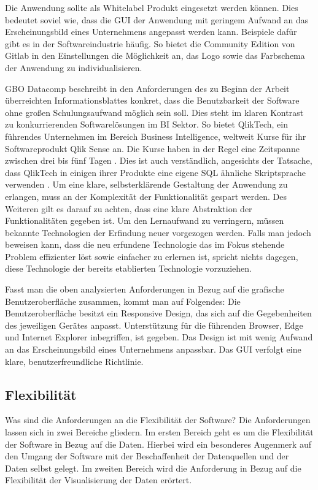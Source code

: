 Die Anwendung sollte als Whitelabel Produkt eingesetzt werden können. Dies bedeutet soviel wie,
dass die GUI der Anwendung mit geringem Aufwand an das Erscheinungsbild eines Unternehmens angepasst
werden kann. Beispiele dafür gibt es in der Softwareindustrie häufig. So bietet die Community
Edition von Gitlab in den Einstellungen die Möglichkeit an, das Logo sowie das Farbschema der Anwendung
zu individualisieren.\cite{GitlabDocs}

GBO Datacomp beschreibt in den Anforderungen des zu Beginn der Arbeit überreichten
Informationsblattes konkret, dass die Benutzbarkeit der Software ohne großen Schulungsaufwand möglich sein soll.
Dies steht im klaren Kontrast zu konkurrierenden Softwarelösungen im BI Sektor.
So bietet QlikTech, ein führendes Unternehmen im Bereich Business Intelligence,
weltweit Kurse für ihr Softwareprodukt Qlik Sense an. Die Kurse haben in der
Regel eine Zeitspanne zwischen drei bis fünf Tagen \cite{QlikSenseTraining}.
Dies ist auch verständlich, angesichts der Tatsache, dass QlikTech in einigen
ihrer Produkte eine eigene SQL ähnliche Skriptsprache verwenden \cite{QlikSenseScriptLanguage}.
Um eine klare, selbsterklärende Gestaltung der Anwendung zu erlangen,
muss an der Komplexität der Funktionalität gespart werden. Des Weiteren
gilt es darauf zu achten, dass eine klare Abstraktion der Funktionalitäten
gegeben ist. Um den Lernaufwand zu verringern, müssen bekannte Technologien
der Erfindung neuer vorgezogen werden. Falls man jedoch beweisen kann,
dass die neu erfundene Technologie das im Fokus stehende Problem effizienter löst
sowie einfacher zu erlernen ist, spricht nichts dagegen, diese Technologie der bereits
etablierten Technologie vorzuziehen.

Fasst man die oben analysierten Anforderungen in Bezug auf die grafische Benutzeroberfläche
zusammen, kommt man auf Folgendes: Die Benutzeroberfläche besitzt ein Responsive Design,
das sich auf die Gegebenheiten des jeweiligen Gerätes anpasst. Unterstützung
für die führenden Browser, Edge und Internet Explorer inbegriffen, ist gegeben.
Das Design ist mit wenig Aufwand an das Erscheinungsbild eines Unternehmens anpassbar.
Das GUI verfolgt eine klare, benutzerfreundliche Richtlinie.

\subsection{Flexibilität}
\label{subsec:flexibilitaet}
Was sind die Anforderungen an die Flexibilität der Software? Die Anforderungen lassen sich in zwei
Bereiche gliedern. Im ersten Bereich geht es um die Flexibilität der Software in Bezug auf die Daten. Hierbei wird ein besonderes
Augenmerk auf den Umgang der Software mit der Beschaffenheit der Datenquellen und der Daten selbst gelegt. Im zweiten Bereich
wird die Anforderung in Bezug auf die Flexibilität der Visualisierung der Daten erörtert.

